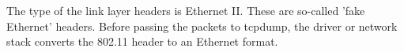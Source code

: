 The type of the link layer headers is Ethernet II. These are so-called 'fake Ethernet' headers. Before passing the packets to tcpdump, the driver or network stack converts the 802.11 header to an Ethernet format.
